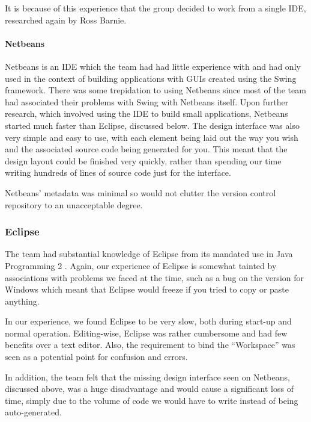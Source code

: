 It is because of this experience that the group decided to work from a
single IDE, researched again by Ross Barnie.

\paragraph{Netbeans \cite{netbeans}}
\label{impl:ui:ide:netbeans}

Netbeans is an IDE which the team had had little experience with and had
only used in the context of building applications with GUIs created
using the Swing framework.
There was some trepidation to using Netbeans since most of the team
had associated their problems with Swing with Netbeans itself.
Upon further research, which involved using the IDE to build small
applications, Netbeans started much faster than Eclipse, discussed
below.
The design interface was also very simple and easy to use, with each
element being laid out the way you wish and the associated source code
being generated for you.
This meant that the design layout could be finished very quickly,
rather than spending our time writing hundreds of lines of source code
just for the interface.

Netbeans' metadata was minimal so would not clutter the version
control repository to an unacceptable degree.

\subsubsection{Eclipse \cite{eclipse}}
\label{impl:ui:ide:eclipse}

The team had substantial knowledge of Eclipse from its mandated use in
Java Programming 2 \cite{javaProgramming2}. Again, our experience of 
Eclipse is somewhat tainted by associations with problems we faced at 
the time, such as a bug on the version for Windows which meant that 
Eclipse would freeze if you tried to copy or paste anything.

In our experience, we found Eclipse to be very slow, both during 
start-up and normal operation. 
Editing-wise, Eclipse was rather cumbersome and had few benefits over
a text editor.
Also, the requirement to bind the ``Workspace'' was seen as a potential
point for confusion and errors.

In addition, the team felt that the missing design interface seen on
Netbeans, discussed above, was a huge disadvantage and would cause a
significant loss of time, simply due to the volume of code we would
have to write instead of being auto-generated.

